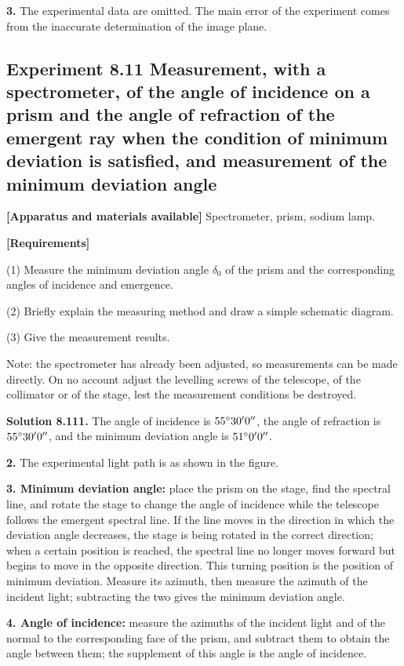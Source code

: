 \textbf{3.} The experimental data are omitted. The main error of the experiment comes from the inaccurate determination of the image plane.

\subsection*{Experiment 8.11 \quad Measurement, with a spectrometer, of the angle of incidence on a prism and the angle of refraction of the emergent ray when the condition of minimum deviation is satisfied, and measurement of the minimum deviation angle}

\textbf{[Apparatus and materials available]} Spectrometer, prism, sodium lamp.

\textbf{[Requirements]}

(1) Measure the minimum deviation angle $\delta_0$ of the prism and the corresponding angles of incidence and emergence.

(2) Briefly explain the measuring method and draw a simple schematic diagram.

(3) Give the measurement results.

Note: the spectrometer has already been adjusted, so measurements can be made directly. On no account adjust the levelling screws of the telescope, of the collimator or of the stage, lest the measurement conditions be destroyed.

\textbf{Solution 8.11}\quad \textbf{1.} The angle of incidence is $55^{\circ}30'0''$, the angle of refraction is $55^{\circ}30'0''$, and the minimum deviation angle is $51^{\circ}0'0''$.

\textbf{2.} The experimental light path is as shown in the figure.

\textbf{3. Minimum deviation angle:} place the prism on the stage, find the spectral line, and rotate the stage to change the angle of incidence while the telescope follows the emergent spectral line. If the line moves in the direction in which the deviation angle decreases, the stage is being rotated in the correct direction; when a certain position is reached, the spectral line no longer moves forward but begins to move in the opposite direction. This turning position is the position of minimum deviation. Measure its azimuth, then measure the azimuth of the incident light; subtracting the two gives the minimum deviation angle.

\textbf{4. Angle of incidence:} measure the azimuths of the incident light and of the normal to the corresponding face of the prism, and subtract them to obtain the angle between them; the supplement of this angle is the angle of incidence.

